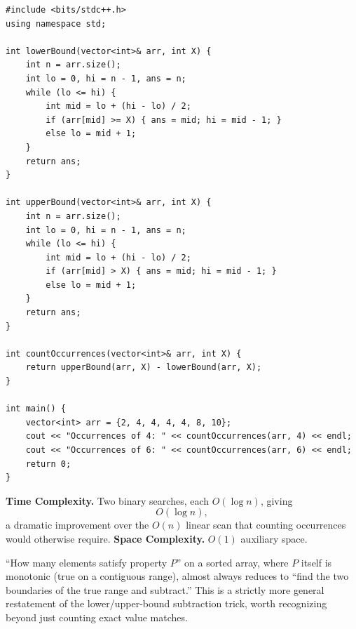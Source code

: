\begin{lstlisting}
#include <bits/stdc++.h>
using namespace std;

int lowerBound(vector<int>& arr, int X) {
    int n = arr.size();
    int lo = 0, hi = n - 1, ans = n;
    while (lo <= hi) {
        int mid = lo + (hi - lo) / 2;
        if (arr[mid] >= X) { ans = mid; hi = mid - 1; }
        else lo = mid + 1;
    }
    return ans;
}

int upperBound(vector<int>& arr, int X) {
    int n = arr.size();
    int lo = 0, hi = n - 1, ans = n;
    while (lo <= hi) {
        int mid = lo + (hi - lo) / 2;
        if (arr[mid] > X) { ans = mid; hi = mid - 1; }
        else lo = mid + 1;
    }
    return ans;
}

int countOccurrences(vector<int>& arr, int X) {
    return upperBound(arr, X) - lowerBound(arr, X);
}

int main() {
    vector<int> arr = {2, 4, 4, 4, 4, 8, 10};
    cout << "Occurrences of 4: " << countOccurrences(arr, 4) << endl;
    cout << "Occurrences of 6: " << countOccurrences(arr, 6) << endl;
    return 0;
}
\end{lstlisting}

\begin{complexitybox}
\textbf{Time Complexity.} Two binary searches, each $O(\log n)$, giving
\[
  O(\log n),
\]
a dramatic improvement over the $O(n)$ linear scan that counting
occurrences would otherwise require.
\textbf{Space Complexity.} $O(1)$ auxiliary space.
\end{complexitybox}

\begin{takeawaybox}
``How many elements satisfy property $P$'' on a sorted array, where $P$
itself is monotonic (true on a contiguous range), almost always reduces to
``find the two boundaries of the true range and subtract.'' This is a
strictly more general restatement of the lower/upper-bound subtraction
trick, worth recognizing beyond just counting exact value matches.
\end{takeawaybox}
